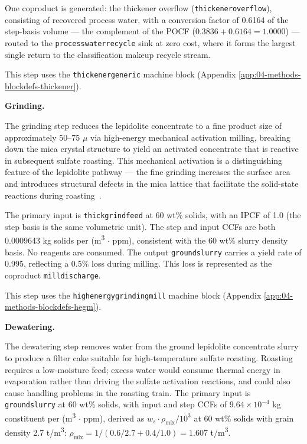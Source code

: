 \documentclass{article}
\renewcommand\_{\textunderscore\allowbreak}
\begin{document}
One coproduct is generated: the thickener overflow (\texttt{thickener\_overflow}), consisting of recovered process water, with a conversion factor of 0.6164 of the step-basis volume --- the complement of the POCF ($0.3836 + 0.6164 = 1.0000$) --- routed to the \texttt{process\_water\_recycle} sink at zero cost, where it forms the largest single return to the classification makeup recycle stream.

This step uses the \texttt{thickener\_generic} machine block (Appendix \ref{app:04-methods-blockdefs-thickener}).

\medskip
\noindent\textbf{Grinding.}\quad

The grinding step reduces the lepidolite concentrate to a fine product size of approximately 50--75 $\mu$ via high-energy mechanical activation milling, breaking down the mica crystal structure to yield an activated concentrate that is reactive in subsequent sulfate roasting. This mechanical activation is a distinguishing feature of the lepidolite pathway --- the fine grinding increases the surface area and introduces structural defects in the mica lattice that facilitate the solid-state reactions during roasting~\citep{dengSystematicReviewSulfate2026, yanExtractionLithiumLepidolite2012}.

The primary input is \texttt{thick\_grind\_feed} at 60 wt\% solids, with an IPCF of 1.0 (the step basis is the same volumetric unit). The step and input CCFs are both 0.0009643 kg solids per (\si{m^3} $\cdot$ ppm), consistent with the 60 wt\% slurry density basis. No reagents are consumed. The output \texttt{ground\_slurry} carries a yield rate of 0.995, reflecting a 0.5\% loss during milling. This loss is represented as the coproduct \texttt{mill\_discharge}. 

This step uses the \texttt{high\_energy\_grinding\_mill} machine block (Appendix \ref{app:04-methods-blockdefs-hegm}).

\medskip
\noindent\textbf{Dewatering.}\quad

The dewatering step removes water from the ground lepidolite concentrate slurry to produce a filter cake suitable for high-temperature sulfate roasting. Roasting requires a low-moisture feed; excess water would consume thermal energy in evaporation rather than driving the sulfate activation reactions, and could also cause handling problems in the roasting train. The primary input is \texttt{ground\_slurry} at 60 wt\% solids, with input and step CCFs of $9.64 \times 10^{-4}$ kg constituent per (\si{m^3} $\cdot$
ppm), derived as $w_s \cdot \rho_{\text{mix}} / 10^3$ at 60 wt\% solids with grain density 2.7 \si{t/m^3}: $\rho_{\text{mix}} = 1/(0.6/2.7 + 0.4/1.0) = 1.607$ \si{t/m^3}.
\end{document}
